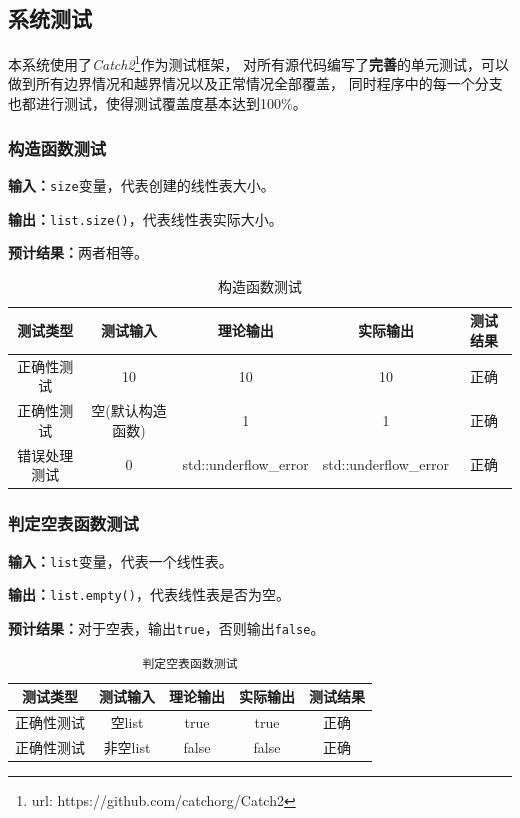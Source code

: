 \subsection{系统测试}
本系统使用了\textit{Catch2}\footnote{url: https://github.com/catchorg/Catch2}作为测试框架，
对所有源代码编写了\textbf{完善}的单元测试，可以做到所有边界情况和越界情况以及正常情况全部覆盖，
同时程序中的每一个分支也都进行测试，使得测试覆盖度基本达到100\%。
\subsubsection{构造函数测试}
\textbf{输入：}\texttt{size}变量，代表创建的线性表大小。
\par
\textbf{输出：}\texttt{list.size()}，代表线性表实际大小。
\par
\textbf{预计结果：}两者相等。
\begin{table}[h]
\centering
\caption{构造函数测试}
\begin{tabular}{@{}ccccc@{}}
\toprule
\multicolumn{1}{c}{测试类型}    & \multicolumn{1}{c}{测试输入} & \multicolumn{1}{c}{理论输出} & \multicolumn{1}{c}{实际输出} & \multicolumn{1}{c}{测试结果} \\ \midrule
\multicolumn{1}{c|}{正确性测试}  & 10&10&10&正确\\
\multicolumn{1}{c|}{正确性测试}  & 空(默认构造函数)&1&1&正确\\
\multicolumn{1}{c|}{错误处理测试} & 0& std::underflow\_error& std::underflow\_error& 正确\\ \bottomrule
\end{tabular}
\label{tab:inittest2}
\end{table}

\subsubsection{判定空表函数测试}
\textbf{输入：}\texttt{list}变量，代表一个线性表。
\par
\textbf{输出：}\texttt{list.empty()}，代表线性表是否为空。
\par
\textbf{预计结果：}对于空表，输出\texttt{true}，否则输出\texttt{false}。
\begin{table}[h]
\centering
    \caption{\texttt{判定空表函数测试}}
\begin{tabular}{@{}ccccc@{}}
\toprule
\multicolumn{1}{c}{测试类型}    & \multicolumn{1}{c}{测试输入} & \multicolumn{1}{c}{理论输出} & \multicolumn{1}{c}{实际输出} & \multicolumn{1}{c}{测试结果} \\ \midrule
\multicolumn{1}{c|}{正确性测试}  & 空list&true&true&正确\\
\multicolumn{1}{c|}{正确性测试}  & 非空list&false&false&正确\\ \bottomrule
\end{tabular}
\label{tab:emptytest2}
\end{table}



